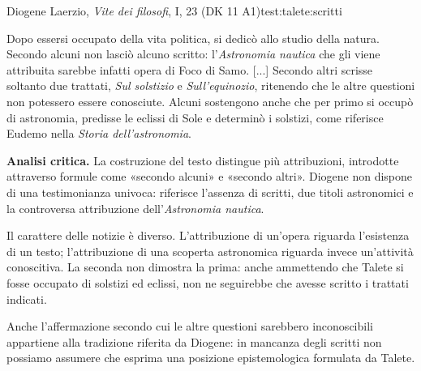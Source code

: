 \begin{testimonianza}{Diogene Laerzio, \emph{Vite dei filosofi}, I, 23 (DK 11 A1)}{test:talete:scritti}
\smallskip
{}\par
Dopo essersi occupato della vita politica, si dedicò allo studio della natura. Secondo alcuni non lasciò alcuno scritto: l'\emph{Astronomia nautica} che gli viene attribuita sarebbe infatti opera di Foco di Samo. [...] Secondo altri scrisse soltanto due trattati, \emph{Sul solstizio} e \emph{Sull'equinozio}, ritenendo che le altre questioni non potessero essere conosciute. Alcuni sostengono anche che per primo si occupò di astronomia, predisse le eclissi di Sole e determinò i solstizi, come riferisce Eudemo nella \emph{Storia dell'astronomia}.
\end{testimonianza}


\noindent\textbf{Analisi critica.}
La costruzione del testo distingue più attribuzioni, introdotte attraverso formule come «secondo alcuni» e «secondo altri». Diogene non dispone di una testimonianza univoca: riferisce l'assenza di scritti, due titoli astronomici e la controversa attribuzione dell'\emph{Astronomia nautica}.

Il carattere delle notizie è diverso. L'attribuzione di un'opera riguarda l'esistenza di un testo; l'attribuzione di una scoperta astronomica riguarda invece un'attività conoscitiva. La seconda non dimostra la prima: anche ammettendo che Talete si fosse occupato di solstizi ed eclissi, non ne seguirebbe che avesse scritto i trattati indicati.

Anche l'affermazione secondo cui le altre questioni sarebbero inconoscibili appartiene alla tradizione riferita da Diogene: in mancanza degli scritti non possiamo assumere che esprima una posizione epistemologica formulata da Talete.

